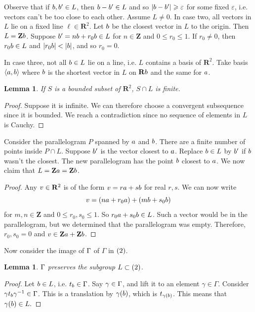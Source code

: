 \documentclass[11pt, oneside]{amsart}
\numberwithin{equation}{section}
\numberwithin{theorem}{section}
\newtheorem{lemma}[theorem]{Lemma}
\theoremstyle{definition}
\let\O\relax
\let\bar\relax
\let\bf\relax
\def\Z{\mathbf{Z}}
\def\R{\mathbf{R}}
\begin{document}
{Observe that if $\bf b,\bf b'\in L$, then $\bf b-\bf b'\in L$ and so $|\bf b -\bf b'| \geqslant \varepsilon$ for some fixed $\varepsilon$, i.e. vectors can't be too close to each other. Assume $L\neq 0$. In case two, all vectors in $L$ lie on a fixed line $\ell \in\R^2$. Let $\bf b$ be the closest vector in $L$ to the origin. Then $L = \Z\bf b$. Suppose $\bf b' =  n\bf b + r_0\bf b\in L$ for $n\in \Z$ and $0\leqslant r_0\leqslant1$. If $r_0\neq0$, then $r_0\bf b\in L$ and $|r_0\bf b| < |\bf b|$, and so $r_0=0$. 

In case three, not all $\bf b\in L$ lie on a line, i.e. $L$ contains a basis of $\R^2$. Take basis $\langle\bf a,\bf b\rangle$ where $\bf b$ is the shortest vector in $L$ on $\R\bf b$ and the same for $\bf a$.

\begin{lemma}
If $S$ is a bounded subset of $\R^2$, $S\cap L$ is finite. 
\end{lemma}
\begin{proof}
Suppose it is infinite. We can therefore choose a convergent subsequence since it is bounded. We reach a contradiction since no sequence of elements in $L$ is Cauchy. 
\end{proof}
Consider the parallelogram $P$ spanned by $\bf a $ and $\bf b$. There are a finite number of points inside $P\cap L$. Suppose $\bf b'$ is the vector closest to $\bf a$. Replace $\bf b\in L$ by $\bf b'$ if $\bf b$ wasn't the closest. The new parallelogram has the point $\bf b$ closest to $\bf a$. We now claim that $L = \Z\bf a = \Z\bf b$.
\begin{proof}
Any $\bf v\in \R^2$ is of the form $\bf v = r\bf a + s\bf b$ for real $r, s$. We can now write
$$
\bf v = (n\bf a + r_0\bf a) + (m\bf b + s_0 \bf b)
$$
for $m,n\in \Z$ and $0\leqslant r_0,s_0\leqslant1$. So $r_0\bf a + s_0\bf b \in L$. Such a vector would be in the parallelogram, but we determined that the parallelogram was empty. Therefore, $r_0,s_0=0$ and $\bf v \in \Z\bf a + \Z\bf b$. 
\end{proof}
Now consider the image of $\bar{\Gamma}$ of $\Gamma$ in $\O(2)$.
\begin{lemma}
$\bar \Gamma$ preserves the subgroup $L\subset \O(2)$.
\end{lemma}
\begin{proof}
Let $\bf b \in L$, i.e. $t_\bf b\in \Gamma$. Say $\bar\gamma \in \bar\Gamma$, and lift it to an element $\gamma \in \Gamma$. Consider $\gamma t_\bf b\gamma^{-1}\in \Gamma$. This is a translation by $\bar \gamma (\bf b)$, which is $t_{\bar \gamma(\bf b)}$. This means that $\bar\gamma(\bf b) \in L.$

\end{proof}}
\end{document}

